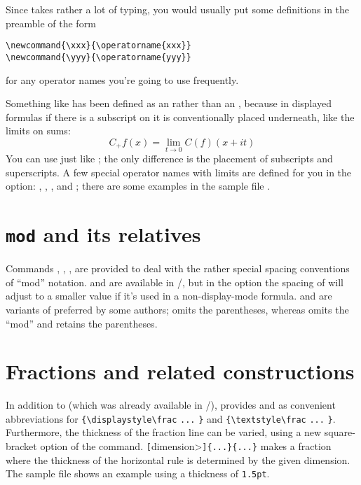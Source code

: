 Since  takes rather a lot of typing, you would usually
put some definitions in the preamble of the form
\begin{verbatim}
\newcommand{\xxx}{\operatorname{xxx}}
\newcommand{\yyy}{\operatorname{yyy}}
\end{verbatim}
for any operator names you're going to use frequently.

Something like  has been defined as an
 rather than an , because in
displayed formulas if there is a subscript on  it is conventionally
placed underneath, like the limits on sums:
\begin{equation}
C_+f(x)=\lim_{t\to0}C(f)(x+it)
\end{equation}
You can use  just like ; the
only difference is the placement of subscripts and superscripts.
A few special operator names with limits are defined for you in the
 option:  , , ,
and ; there are some examples in the sample file
.

\section{{\tt\bslash mod} and its relatives} Commands ,
, ,  are provided to deal with the rather
special spacing conventions of ``mod'' notation.   and 
are available in \latex/, but in the  option the spacing of
 will adjust to a smaller value if it's used in a
non-display-mode formula.   and  are variants of
 preferred by some authors;  omits the parentheses,
whereas  omits the ``mod'' and retains the parentheses.

\section{Fractions and related constructions}
\label{fracs}

In addition to  (which was already available in \latex/),
 provides  and  as convenient
abbreviations for \verb"{\displaystyle\frac" \verb"..." \verb"}" and
\verb"{\textstyle\frac" \verb"..." \verb"}". Furthermore, the
thickness of the fraction line can be varied, using
a new square-bracket option of the  command.
\5\verb"["\<dimension>\verb"]"\5\verb"{...}"\5\verb"{...}"
makes a fraction where the thickness of the horizontal rule is determined by
the given dimension.  The sample file  shows an
example using a thickness of \verb=1.5pt=.


